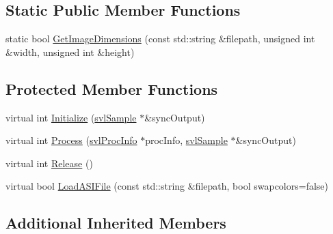 \subsection*{Static Public Member Functions}
\begin{DoxyCompactItemize}
\item 
static bool \hyperlink{classsvl_filter_source3_d_sensor_file_a594e035fcd14a6f168963111cc3a23c6}{Get\-Image\-Dimensions} (const std\-::string \&filepath, unsigned int \&width, unsigned int \&height)
\end{DoxyCompactItemize}
\subsection*{Protected Member Functions}
\begin{DoxyCompactItemize}
\item 
virtual int \hyperlink{classsvl_filter_source3_d_sensor_file_ac1994fdb82f41d883eb701e47dd437dc}{Initialize} (\hyperlink{classsvl_sample}{svl\-Sample} $\ast$\&sync\-Output)
\item 
virtual int \hyperlink{classsvl_filter_source3_d_sensor_file_afed41820a644c470c964c1dde3f32910}{Process} (\hyperlink{structsvl_proc_info}{svl\-Proc\-Info} $\ast$proc\-Info, \hyperlink{classsvl_sample}{svl\-Sample} $\ast$\&sync\-Output)
\item 
virtual int \hyperlink{classsvl_filter_source3_d_sensor_file_a0291ce78fec02b9935a501cfa65d8cf1}{Release} ()
\item 
virtual bool \hyperlink{classsvl_filter_source3_d_sensor_file_a785f0025e95d4c805be9fb26a4afab86}{Load\-A\-S\-I\-File} (const std\-::string \&filepath, bool swapcolors=false)
\end{DoxyCompactItemize}
\subsection*{Additional Inherited Members}


